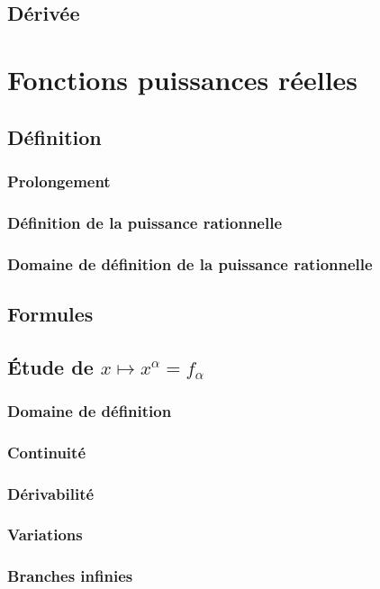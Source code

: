\documentclass[12pt,a4paper,french]{book}
\begin{document}
		\subsection{Dérivée}
	\section{Fonctions puissances réelles}
		\subsection{Définition}
			\subsubsection{Prolongement}
			\subsubsection{Définition de la puissance rationnelle}
			
			\subsubsection{Domaine de définition de la puissance rationnelle}
			
		\subsection{Formules}
		
		\subsection{Étude de $x\mapsto x^{\alpha} = f_{\alpha}$}
			\subsubsection{Domaine de définition}
			\subsubsection{Continuité}
			\subsubsection{Dérivabilité}
			\subsubsection{Variations}
			\subsubsection{Branches infinies}
\end{document}
